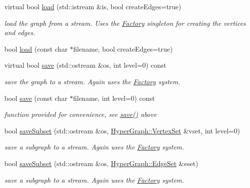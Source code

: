 \begin{DoxyCompactItemize}
virtual bool \hyperlink{structg2o_1_1OptimizableGraph_a34f4a170d58551ee9efac7a7a78fa833}{load} (std\+::istream \&is, bool create\+Edges=true)
\begin{DoxyCompactList}\small\item\em load the graph from a stream. Uses the \hyperlink{classg2o_1_1Factory}{Factory} singleton for creating the vertices and edges. \end{DoxyCompactList}\item 
bool \hyperlink{structg2o_1_1OptimizableGraph_a305fe91c405fc960df051d9581e524bc}{load} (const char $\ast$filename, bool create\+Edges=true)
\item 
virtual bool \hyperlink{structg2o_1_1OptimizableGraph_ac38749c4a2416dcbaf37a111996f7483}{save} (std\+::ostream \&os, int level=0) const 
\begin{DoxyCompactList}\small\item\em save the graph to a stream. Again uses the \hyperlink{classg2o_1_1Factory}{Factory} system. \end{DoxyCompactList}\item 
bool \hyperlink{structg2o_1_1OptimizableGraph_a35d607b133c3cb3a04fb82a3376bbcfc}{save} (const char $\ast$filename, int level=0) const 
\begin{DoxyCompactList}\small\item\em function provided for convenience, see \hyperlink{structg2o_1_1OptimizableGraph_ac38749c4a2416dcbaf37a111996f7483}{save()} above \end{DoxyCompactList}\item 
bool \hyperlink{structg2o_1_1OptimizableGraph_adcf211f9c7bf3ee9dab65b130807402c}{save\+Subset} (std\+::ostream \&os, \hyperlink{classg2o_1_1HyperGraph_a703938cdb4bb636860eed55a2489d70c}{Hyper\+Graph\+::\+Vertex\+Set} \&vset, int level=0)
\begin{DoxyCompactList}\small\item\em save a subgraph to a stream. Again uses the \hyperlink{classg2o_1_1Factory}{Factory} system. \end{DoxyCompactList}\item 
bool \hyperlink{structg2o_1_1OptimizableGraph_a2a08383ab953d435eaaca6231b64c3b6}{save\+Subset} (std\+::ostream \&os, \hyperlink{classg2o_1_1HyperGraph_a5e2970e236c0dcb4eff7c205d7b6b4ae}{Hyper\+Graph\+::\+Edge\+Set} \&eset)
\begin{DoxyCompactList}\small\item\em save a subgraph to a stream. Again uses the \hyperlink{classg2o_1_1Factory}{Factory} system. \end{DoxyCompactList}\item 

\end{DoxyCompactItemize}
